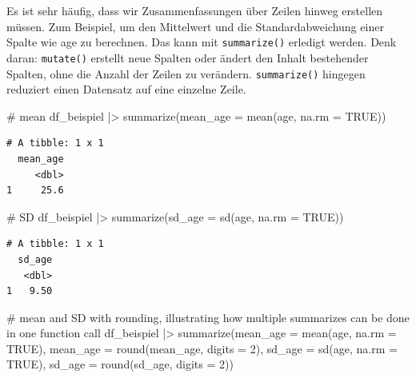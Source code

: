 \documentclass[
  letterpaper,
  DIV=11,
  numbers=noendperiod]{scrreprt}
\newenvironment{Shaded}{\begin{snugshade}}{\end{snugshade}}
\newcommand{\AttributeTok}[1]{\textcolor[rgb]{0.40,0.45,0.13}{#1}}
\newcommand{\CommentTok}[1]{\textcolor[rgb]{0.37,0.37,0.37}{#1}}
\newcommand{\ConstantTok}[1]{\textcolor[rgb]{0.56,0.35,0.01}{#1}}
\newcommand{\DecValTok}[1]{\textcolor[rgb]{0.68,0.00,0.00}{#1}}
\newcommand{\FunctionTok}[1]{\textcolor[rgb]{0.28,0.35,0.67}{#1}}
\newcommand{\NormalTok}[1]{\textcolor[rgb]{0.00,0.23,0.31}{#1}}
\newcommand{\SpecialCharTok}[1]{\textcolor[rgb]{0.37,0.37,0.37}{#1}}
\begin{document}
Es ist sehr häufig, dass wir Zusammenfassungen über Zeilen hinweg
erstellen müssen. Zum Beispiel, um den Mittelwert und die
Standardabweichung einer Spalte wie age zu berechnen. Das kann mit
\texttt{summarize()} erledigt werden. Denk daran: \texttt{mutate()}
erstellt neue Spalten oder ändert den Inhalt bestehender Spalten, ohne
die Anzahl der Zeilen zu verändern. \texttt{summarize()} hingegen
reduziert einen Datensatz auf eine einzelne Zeile.

\begin{Shaded}
\begin{Highlighting}[]
\CommentTok{\# mean}
\NormalTok{df\_beispiel }\SpecialCharTok{|\textgreater{}} \FunctionTok{summarize}\NormalTok{(}\AttributeTok{mean\_age =} \FunctionTok{mean}\NormalTok{(age, }\AttributeTok{na.rm =} \ConstantTok{TRUE}\NormalTok{))}
\end{Highlighting}
\end{Shaded}

\begin{verbatim}
# A tibble: 1 x 1
  mean_age
     <dbl>
1     25.6
\end{verbatim}

\begin{Shaded}
\begin{Highlighting}[]
\CommentTok{\# SD}
\NormalTok{df\_beispiel }\SpecialCharTok{|\textgreater{}} 
  \FunctionTok{summarize}\NormalTok{(}\AttributeTok{sd\_age =} \FunctionTok{sd}\NormalTok{(age, }\AttributeTok{na.rm =} \ConstantTok{TRUE}\NormalTok{))}
\end{Highlighting}
\end{Shaded}

\begin{verbatim}
# A tibble: 1 x 1
  sd_age
   <dbl>
1   9.50
\end{verbatim}

\begin{Shaded}
\begin{Highlighting}[]
\CommentTok{\# mean and SD with rounding, illustrating how multiple summarizes can be done in one function call}
\NormalTok{df\_beispiel }\SpecialCharTok{|\textgreater{}} 
  \FunctionTok{summarize}\NormalTok{(}\AttributeTok{mean\_age =} \FunctionTok{mean}\NormalTok{(age, }\AttributeTok{na.rm =} \ConstantTok{TRUE}\NormalTok{),}
            \AttributeTok{mean\_age =} \FunctionTok{round}\NormalTok{(mean\_age, }\AttributeTok{digits =} \DecValTok{2}\NormalTok{),}
            \AttributeTok{sd\_age =} \FunctionTok{sd}\NormalTok{(age, }\AttributeTok{na.rm =} \ConstantTok{TRUE}\NormalTok{),}
            \AttributeTok{sd\_age =} \FunctionTok{round}\NormalTok{(sd\_age, }\AttributeTok{digits =} \DecValTok{2}\NormalTok{))}
\end{Highlighting}
\end{Shaded}
\end{document}
